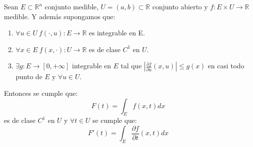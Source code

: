 \begin{teorema} 
    Sean $E \subset \mathbb{R}^n$ conjunto medible, $U = (a, b) \subset \mathbb{R}$ conjunto abierto y $f: E \times U \to \mathbb{R}$ medible. Y además supongamos que:
    \vspace{-0.5em}
    \begin{enumerate}
        \item $\forall u \in U \ f(\cdot, u): E \to \mathbb{R}$ es integrable en E.
        \item $\forall x \in E \ f(x, \cdot): U \to \mathbb{R}$ es de clase $C^1$ en $U$.
        \item $\exists g: E \to [0, +\infty]$ integrable en $E$ tal que $|\frac{\partial f}{\partial u}(x, u)| \leq g(x)$ en casi todo punto de $E$ y $\forall u \in U$.
    \end{enumerate}
    Entonces se cumple que:
    $$ F(t) = \int_{E}f(x,t)dx $$ es de clase $C^1$ en $U$ y $\forall t \in U$ se cumple que: $$ F'(t) = \int_{E}\frac{\partial f}{\partial t}(x, t)dx $$
\end{teorema}
